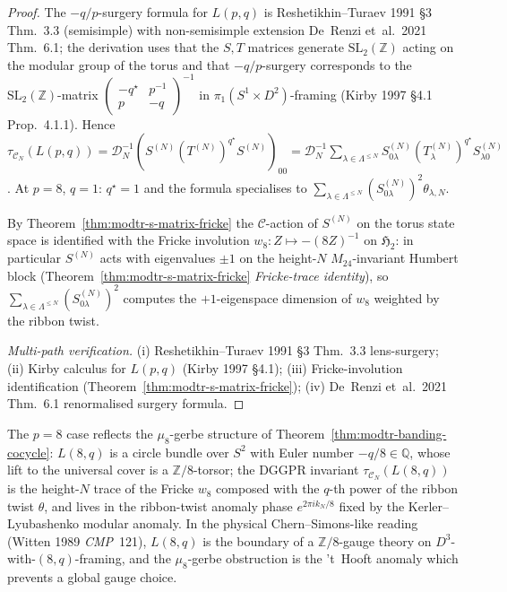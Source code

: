 \begin{proof}
The $-q/p$-surgery formula for $L(p, q)$ is Reshetikhin--Turaev 1991
\S 3 Thm.~3.3 (semisimple) with non-semisimple extension
De~Renzi et~al.\ 2021 Thm.~6.1; the derivation uses that the $S, T$
matrices generate $\mathrm{SL}_2(\mathbb Z)$ acting on the modular
group of the torus and that $-q/p$-surgery corresponds to the
$\mathrm{SL}_2(\mathbb Z)$-matrix
$\left(\begin{smallmatrix}-q^\star & p^{-1}\\ p & -q\end{smallmatrix}
\right)^{-1}$ in $\pi_1(S^1\times D^2)$-framing (Kirby 1997
\S 4.1 Prop.~4.1.1). Hence
\(\tau_{\mathcal C_N}(L(p, q)) =
\mathcal D_N^{-1} (S^{(N)}(T^{(N)})^{q^\star}S^{(N)})_{00}
= \mathcal D_N^{-1}
\sum_{\lambda\in\Lambda^{\leq N}}
S^{(N)}_{0\lambda}(T^{(N)}_\lambda)^{q^\star}S^{(N)}_{\lambda 0}\).
At $p = 8$, $q = 1$: $q^\star = 1$ and the formula specialises to
\(\sum_{\lambda\in\Lambda^{\leq N}}
(S^{(N)}_{0\lambda})^2\theta_{\lambda,N}\).

By Theorem~\ref{thm:modtr-s-matrix-fricke} the $\mathcal C$-action of
\(S^{(N)}\) on the torus state space is identified with the Fricke involution
$w_8\colon Z\mapsto -(8Z)^{-1}$ on $\mathfrak H_2$: in particular
\(S^{(N)}\) acts with eigenvalues $\pm 1$ on the height-\(N\)
\(M_{24}\)-invariant Humbert
block (Theorem~\ref{thm:modtr-s-matrix-fricke} \emph{Fricke-trace
identity}), so \(\sum_{\lambda\in\Lambda^{\leq N}}
(S^{(N)}_{0\lambda})^2\) computes the
$+1$-eigenspace dimension of $w_8$ weighted by the ribbon twist.

\emph{Multi-path verification.}
(i) Reshetikhin--Turaev 1991 \S 3 Thm.~3.3 lens-surgery;
(ii) Kirby calculus for $L(p, q)$ (Kirby 1997 \S 4.1);
(iii) Fricke-involution identification
(Theorem~\ref{thm:modtr-s-matrix-fricke});
(iv) De~Renzi et~al.\ 2021 Thm.~6.1 renormalised surgery formula.
\end{proof}

\begin{remark}
\label{rem:modtr-lens-gerbe-torsor}
The $p = 8$ case reflects the $\mu_8$-gerbe structure of
Theorem~\ref{thm:modtr-banding-cocycle}: $L(8, q)$ is a circle bundle
over $S^2$ with Euler number $-q/8\in\mathbb Q$, whose lift to the
universal cover is a $\mathbb Z/8$-torsor; the DGGPR invariant
\(\tau_{\mathcal C_N}(L(8, q))\) is the height-\(N\) trace of the Fricke $w_8$
composed with the $q$-th power of the ribbon twist $\theta$, and
lives in the ribbon-twist anomaly phase \(e^{2\pi i k_N/8}\) fixed by
the Kerler--Lyubashenko modular anomaly. In the physical
Chern--Simons-like reading (Witten 1989 \emph{CMP}~121),
$L(8, q)$ is the boundary of a $\mathbb Z/8$-gauge theory on
$D^3$-with-$(8, q)$-framing, and the $\mu_8$-gerbe obstruction is
the 't~Hooft anomaly which prevents a global gauge choice.
\end{remark}

